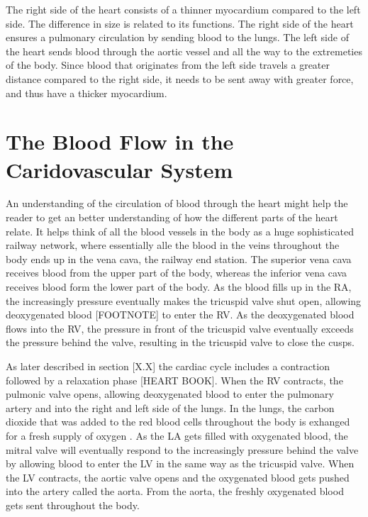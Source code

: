The right side of the heart consists of a thinner myocardium compared to the left side. The difference in size is related to its functions. The right side of the heart ensures a pulmonary circulation by sending blood to the lungs. The left side of the heart sends blood through the aortic vessel and all the way to the extremeties of the body. Since blood that originates from the left side travels a greater distance compared to the right side, it needs to be sent away with greater force, and thus have a thicker myocardium.




\section{The Blood Flow in the Caridovascular System}
An understanding of the circulation of blood through the heart might help the reader to get an better understanding of how the different parts of the heart relate. It helps think of all the blood vessels in the body as a huge sophisticated railway network, where essentially alle the blood in the veins throughout the body ends up in the vena cava, the railway end station. The superior vena cava receives blood from the upper part of the body, whereas the inferior vena cava receives blood form the lower part of the body. As the blood fills up in the RA, the increasingly pressure eventually makes the tricuspid valve shut open, allowing deoxygenated blood [FOOTNOTE] to enter the RV. As the deoxygenated blood flows into the RV, the pressure in front of the tricuspid valve eventually exceeds the pressure behind the valve, resulting in the tricuspid valve to close the cusps. 

As later described in section [X.X] the cardiac cycle includes a contraction followed by a relaxation phase [HEART BOOK]. When the RV contracts, the pulmonic valve opens, allowing deoxygenated blood to enter the pulmonary artery and into the right and left side of the lungs. In the lungs, the carbon dioxide that was added to the red blood cells throughout the body is exhanged for a fresh supply of oxygen \cite{article21}.
As the LA gets filled with oxygenated blood, the mitral valve will eventually respond to the increasingly pressure behind the valve by allowing blood to enter the LV in the same way as the tricuspid valve. When the LV contracts, the aortic valve opens and the oxygenated blood gets pushed into the artery called the aorta. From the aorta, the freshly oxygenated blood gets sent throughout the body.

